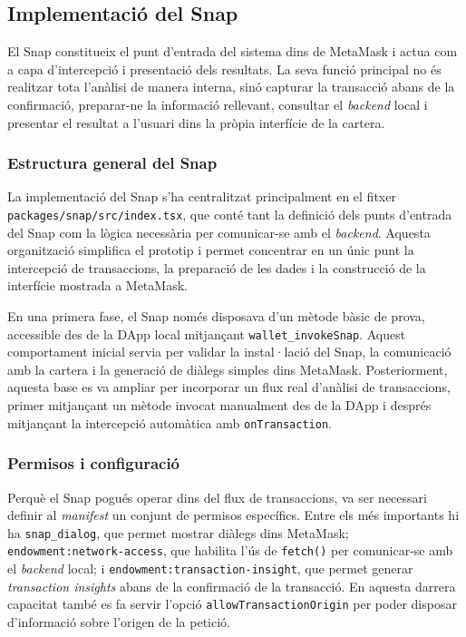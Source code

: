 \subsection{Implementació del Snap}

El Snap constitueix el punt d’entrada del sistema dins de MetaMask i actua com a capa d’intercepció i presentació dels resultats. La seva funció principal no és realitzar tota l’anàlisi de manera interna, sinó capturar la transacció abans de la confirmació, preparar-ne la informació rellevant, consultar el \textit{backend} local i presentar el resultat a l’usuari dins la pròpia interfície de la cartera.

\subsubsection{Estructura general del Snap}

La implementació del Snap s’ha centralitzat principalment en el fitxer \texttt{packages/snap/src/index.tsx}, que conté tant la definició dels punts d’entrada del Snap com la lògica necessària per comunicar-se amb el \textit{backend}. Aquesta organització simplifica el prototip i permet concentrar en un únic punt la intercepció de transaccions, la preparació de les dades i la construcció de la interfície mostrada a MetaMask.

En una primera fase, el Snap només disposava d’un mètode bàsic de prova, accessible des de la DApp local mitjançant \texttt{wallet\_invokeSnap}. Aquest comportament inicial servia per validar la instal·lació del Snap, la comunicació amb la cartera i la generació de diàlegs simples dins MetaMask. Posteriorment, aquesta base es va ampliar per incorporar un flux real d’anàlisi de transaccions, primer mitjançant un mètode invocat manualment des de la DApp i després mitjançant la intercepció automàtica amb \texttt{onTransaction}. 

\subsubsection{Permisos i configuració}

Perquè el Snap pogués operar dins del flux de transaccions, va ser necessari definir al \textit{manifest} un conjunt de permisos específics. Entre els més importants hi ha \texttt{snap\_dialog}, que permet mostrar diàlegs dins MetaMask; \texttt{endowment:network-access}, que habilita l’ús de \texttt{fetch()} per comunicar-se amb el \textit{backend} local; i \texttt{endowment:transaction-insight}, que permet generar \textit{transaction insights} abans de la confirmació de la transacció. En aquesta darrera capacitat també es fa servir l’opció \texttt{allowTransactionOrigin} per poder disposar d’informació sobre l’origen de la petició. 

